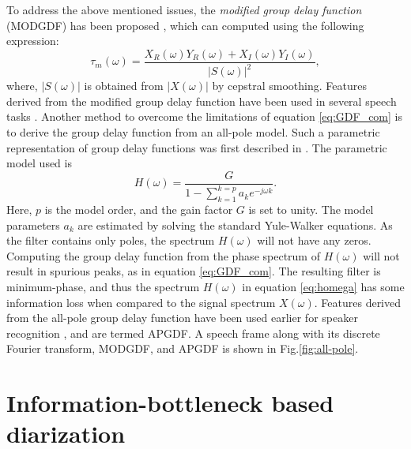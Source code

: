\documentclass[conference]{IEEEtran}
\begin{document}
To address the above mentioned issues, the
\textit{modified group delay function} (MODGDF) has been proposed
\cite{modifiedGD}, which can
computed using the following expression:
\begin{equation}
\tau_{m}(\omega) =  
\frac{X_R(\omega)Y_R(\omega) + X_I(\omega)Y_I(\omega)}{|S(\omega)|^2}, 
\label{eq:MODGDF}
\end{equation}
where, $|S(\omega)|$ is obtained from $|X(\omega)|$ by cepstral smoothing.
Features derived from the modified group delay function have been used in
several speech tasks \cite{modifiedGD}.
Another method to overcome the limitations of equation \ref{eq:GDF_com} is to
derive the group delay function from an all-pole model. Such a parametric
representation of group delay functions was first described in \cite{yegnaJASA}.
The parametric model used is
\begin{equation}
H(\omega) =  \frac{G}{1 - \sum_{k=1}^{k = p} a_k e^{-j\omega k}}.
\label{eq:homega}
\end{equation}
Here, $p$ is the model order, and the gain factor $G$ is set to unity. The model
parameters $a_k$ are estimated by solving the standard Yule-Walker equations. As
the filter contains only poles, the spectrum $H(\omega)$ will not have any
zeros.  Computing the group delay function from the phase spectrum of
$H(\omega)$ will not result in spurious peaks, as in equation \ref{eq:GDF_com}.
The resulting filter is minimum-phase, and thus the spectrum $H(\omega)$ in
equation \ref{eq:homega} has some information loss when compared to the signal
spectrum $X(\omega)$. Features derived from the all-pole group delay function
have been used earlier for speaker recognition \cite{allPoleGdSid}, and are
termed APGDF. A speech frame along with its discrete Fourier transform, MODGDF, and APGDF is shown in Fig.\ref{fig:all-pole}. 

\section{Information-bottleneck based diarization}
\label{system}

\end{document}

